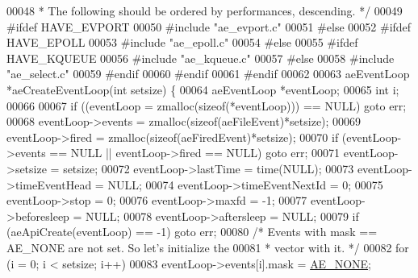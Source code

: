 \begin{DoxyCode}
00048 \textcolor{comment}{ * The following should be ordered by performances, descending. */}
00049 \textcolor{preprocessor}{#}\textcolor{preprocessor}{ifdef} \textcolor{preprocessor}{HAVE\_EVPORT}
00050 \textcolor{preprocessor}{#}\textcolor{preprocessor}{include} \textcolor{stringliteral}{"ae\_evport.c"}
00051 \textcolor{preprocessor}{#}\textcolor{preprocessor}{else}
00052     \textcolor{preprocessor}{#}\textcolor{preprocessor}{ifdef} HAVE\_EPOLL
00053     \textcolor{preprocessor}{#}\textcolor{preprocessor}{include} \textcolor{preprocessor}{"ae\_epoll.c"}
00054     \textcolor{preprocessor}{#}\textcolor{preprocessor}{else}
00055         \textcolor{preprocessor}{#}\textcolor{preprocessor}{ifdef} \textcolor{preprocessor}{HAVE\_KQUEUE}
00056         \textcolor{preprocessor}{#}\textcolor{preprocessor}{include} \textcolor{stringliteral}{"ae\_kqueue.c"}
00057         \textcolor{preprocessor}{#}\textcolor{preprocessor}{else}
00058         \textcolor{preprocessor}{#}\textcolor{preprocessor}{include} \textcolor{stringliteral}{"ae\_select.c"}
00059         \textcolor{preprocessor}{#}\textcolor{preprocessor}{endif}
00060     \textcolor{preprocessor}{#}\textcolor{preprocessor}{endif}
00061 \textcolor{preprocessor}{#}\textcolor{preprocessor}{endif}
00062 
00063 aeEventLoop *aeCreateEventLoop(\textcolor{keywordtype}{int} setsize) \{
00064     aeEventLoop *eventLoop;
00065     \textcolor{keywordtype}{int} i;
00066 
00067     \textcolor{keywordflow}{if} ((eventLoop = zmalloc(\textcolor{keyword}{sizeof}(*eventLoop))) == NULL) \textcolor{keywordflow}{goto} err;
00068     eventLoop->events = zmalloc(\textcolor{keyword}{sizeof}(aeFileEvent)*setsize);
00069     eventLoop->fired = zmalloc(\textcolor{keyword}{sizeof}(aeFiredEvent)*setsize);
00070     \textcolor{keywordflow}{if} (eventLoop->events == NULL || eventLoop->fired == NULL) \textcolor{keywordflow}{goto} err;
00071     eventLoop->setsize = setsize;
00072     eventLoop->lastTime = time(NULL);
00073     eventLoop->timeEventHead = NULL;
00074     eventLoop->timeEventNextId = 0;
00075     eventLoop->stop = 0;
00076     eventLoop->maxfd = -1;
00077     eventLoop->beforesleep = NULL;
00078     eventLoop->aftersleep = NULL;
00079     \textcolor{keywordflow}{if} (aeApiCreate(eventLoop) == -1) \textcolor{keywordflow}{goto} err;
00080     \textcolor{comment}{/* Events with mask == AE\_NONE are not set. So let's initialize the}
00081 \textcolor{comment}{     * vector with it. */}
00082     \textcolor{keywordflow}{for} (i = 0; i < setsize; i++)
00083         eventLoop->events[i].mask = \hyperlink{ae_8h_aea2e33b645e48a3fbb26261005f6df41}{AE\_NONE};

\end{DoxyCode}
